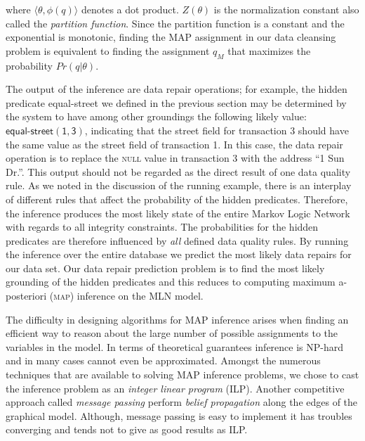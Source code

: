 where $\langle \theta, \phi(q) \rangle$ denotes a dot product. 
$Z(\theta)$ is the normalization constant also called the 
\emph{partition function}. Since the partition function is a constant and the exponential is monotonic, finding the MAP assignment in our data cleansing problem is equivalent to finding the assignment $q_M$ that maximizes the probability $Pr \left( q | \theta \right)$.

The output of the inference are data repair operations; for example, the hidden predicate \textsf{equal-street} we defined in the previous section
may be determined by the system to have among other groundings the following likely value: $\mathsf{\textsf{equal-street}(1, 3)}$, indicating that
the \textsf{street} field for transaction 3 should have the same value as the \textsf{street} field of transaction 1. 
In this case, the data repair operation is to replace the \textsc{null}
value in transaction 3 with the address ``1 Sun Dr.''. This output should not be regarded as the direct result of one data quality rule. As we noted in
the discussion of the running example, there is an interplay of different rules that affect the probability of the hidden predicates. Therefore, the inference produces the most likely state of the entire Markov Logic Network with regards to all integrity constraints. The probabilities for the hidden predicates are therefore influenced by \textit{all} defined data quality rules. By running the inference over the entire database we predict the most likely data repairs for our data set. Our data repair prediction problem is to find the most likely grounding of the hidden predicates and this reduces to computing maximum a-posteriori (\textsc{map})  inference on the MLN model. 

The difficulty in designing algorithms for MAP inference arises
when finding an efficient way to reason about the large number
of possible assignments to the variables in the model. In terms
of theoretical guarantees inference is NP-hard and in many cases
cannot even be approximated. Amongst the numerous techniques 
that are available to solving MAP inference problems, we chose to cast the inference problem as an \emph{integer linear program} (ILP). Another competitive approach called \emph{message
passing} perform \emph{belief propagation} 
along the edges of the graphical model. Although, message passing is easy to implement it has troubles converging and tends not to give as good results as ILP. 
  


